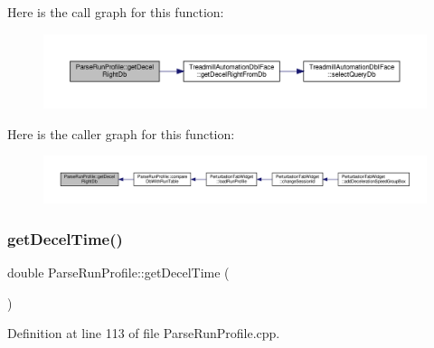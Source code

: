 Here is the call graph for this function\+:
\nopagebreak
\begin{figure}[H]
\begin{center}
\leavevmode
\includegraphics[width=350pt]{class_parse_run_profile_a2572529efbd0c733afb3a771223a859c_cgraph}
\end{center}
\end{figure}
Here is the caller graph for this function\+:
\nopagebreak
\begin{figure}[H]
\begin{center}
\leavevmode
\includegraphics[width=350pt]{class_parse_run_profile_a2572529efbd0c733afb3a771223a859c_icgraph}
\end{center}
\end{figure}
\mbox{\label{class_parse_run_profile_a212d5f9f986c03745be41a5fe610ea8e}} 
\subsubsection{\texorpdfstring{get\+Decel\+Time()}{getDecelTime()}}
{\footnotesize\ttfamily double Parse\+Run\+Profile\+::get\+Decel\+Time (\begin{DoxyParamCaption}{ }\end{DoxyParamCaption})}



Definition at line 113 of file Parse\+Run\+Profile.\+cpp.


